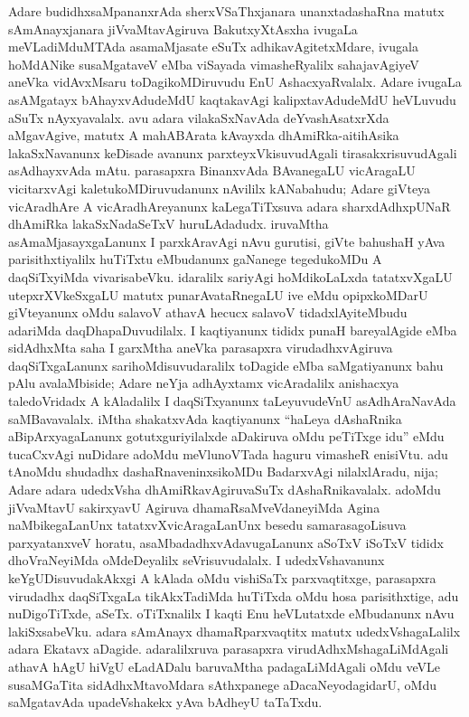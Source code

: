 Adare budidhxsaMpananxrAda sherxVSaThxjanara unanxtadashaRna matutx sAmAnayxjanara jiVvaMtavAgiruva BakutxyXtAsxha ivugaLa meVLadiMduMTAda asamaMjasate eSuTx adhikavAgitetxMdare, ivugala hoMdANike susaMgataveV eMba viSayada vimasheRyalilx sahajavAgiyeV aneVka vidAvxMsaru toDagikoMDiruvudu EnU AshacxyaRvalalx. Adare ivugaLa asAMgatayx bAhayxvAdudeMdU kaqtakavAgi kalipxtavAdudeMdU heVLuvudu aSuTx nAyxyavalalx. avu adara vilakaSxNavAda deYvashAsatxrXda aMgavAgive, matutx A mahABArata kAvayxda dhAmiRka-aitihAsika lakaSxNavanunx keDisade avanunx parxteyxVkisuvudAgali tirasakxrisuvudAgali asAdhayxvAda mAtu. parasapxra BinanxvAda BAvanegaLU vicAragaLU vicitarxvAgi kaletukoMDiruvudanunx nAvililx kANabahudu; Adare giVteya vicAradhAre A vicAradhAreyanunx kaLegaTiTxsuva adara sharxdAdhxpUNaR dhAmiRka lakaSxNadaSeTxV huruLAdadudx. iruvaMtha asAmaMjasayxgaLanunx I parxkAravAgi nAvu gurutisi, giVte bahushaH yAva parisithxtiyalilx huTiTxtu eMbudanunx gaNanege tegedukoMDu A daqSiTxyiMda vivarisabeVku. idaralilx sariyAgi hoMdikoLaLxda tatatxvXgaLU utepxrXVkeSxgaLU matutx punarAvataRnegaLU ive eMdu opipxkoMDarU giVteyanunx oMdu salavoV athavA hecucx salavoV tidadxlAyiteMbudu adariMda daqDhapaDuvudilalx. I kaqtiyanunx tididx punaH bareyalAgide eMba sidAdhxMta saha I garxMtha aneVka parasapxra virudadhxvAgiruva daqSiTxgaLanunx sarihoMdisuvudaralilx toDagide eMba saMgatiyanunx bahu pAlu avalaMbiside; Adare neYja adhAyxtamx vicAradalilx anishacxya taledoVridadx A kAladalilx I daqSiTxyanunx taLeyuvudeVnU asAdhAraNavAda saMBavavalalx. iMtha shakatxvAda kaqtiyanunx ``haLeya dAshaRnika aBipArxyagaLanunx gotutxguriyilalxde aDakiruva oMdu peTiTxge idu'' eMdu tucaCxvAgi nuDidare adoMdu meVlunoVTada haguru vimasheR enisiVtu. adu tAnoMdu shudadhx dashaRnaveninxsikoMDu BadarxvAgi nilalxlAradu, nija; Adare adara udedxVsha dhAmiRkavAgiruvaSuTx dAshaRnikavalalx. adoMdu jiVvaMtavU sakirxyavU Agiruva dhamaRsaMveVdaneyiMda Agina naMbikegaLanUnx tatatxvXvicAragaLanUnx besedu samarasagoLisuva parxyatanxveV horatu, asaMbadadhxvAdavugaLanunx aSoTxV iSoTxV tididx dhoVraNeyiMda oMdeDeyalilx seVrisuvudalalx. I udedxVshavanunx keYgUDisuvudakAkxgi A kAlada oMdu vishiSaTx parxvaqtitxge, parasapxra virudadhx daqSiTxgaLa tikAkxTadiMda huTiTxda oMdu hosa parisithxtige, adu nuDigoTiTxde, aSeTx. oTiTxnalilx I kaqti Enu heVLutatxde eMbudanunx nAvu lakiSxsabeVku. adara sAmAnayx dhamaRparxvaqtitx matutx udedxVshagaLalilx adara Ekatavx aDagide. adaralilxruva parasapxra virudAdhxMshagaLiMdAgali athavA hAgU hiVgU eLadADalu baruvaMtha padagaLiMdAgali oMdu veVLe susaMGaTita sidAdhxMtavoMdara sAthxpanege aDacaNeyodagidarU, oMdu saMgatavAda upadeVshakekx yAva bAdheyU taTaTxdu.

